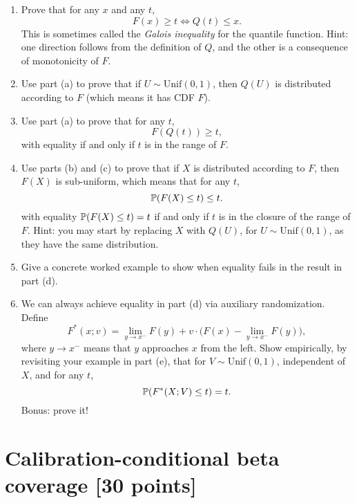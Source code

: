 \documentclass{article}
\begin{document}
\begin{enumerate}[label=(\alph*)]
\item Prove that for any $x$ and any $t$, 
  \marginpar{\small [6 pts]}
  \[
  F(x) \geq t \iff Q(t) \leq x.
  \]
  This is sometimes called the \emph{Galois inequality} for the quantile
  function. Hint: one direction follows from the definition of $Q$, and the
  other is a consequence of monotonicity of $F$.  

\item Use part (a) to prove that if $U \sim \mathrm{Unif}(0,1)$, then $Q(U)$ is
  distributed according to $F$ (which means it has CDF $F$).
  \marginpar{\small [4 pts]}

\item Use part (a) to prove that for any $t$, 
  \marginpar{\small [4 pts]}
  \[
  F(Q(t)) \geq t,
  \]
  with equality if and only if $t$ is in the range of $F$. 

\item Use parts (b) and (c) to prove that if $X$ is distributed according to
  $F$, then $F(X)$ is sub-uniform, which means that for any $t$, 
  \marginpar{\small [6 pts]}
  \[
  \P(F(X) \leq t) \leq t.
  \]
  with equality $\P(F(X) \leq t) = t$ if and only if $t$ is in the closure of
  the range of $F$. Hint: you may start by replacing $X$ with $Q(U)$, for $U
  \sim \mathrm{Unif}(0,1)$, as they have the same distribution.  
  
\item Give a concrete worked example to show when equality fails in the result  
  in part (d).
  \marginpar{\small [4 pts]}

\item We can always achieve equality in part (d) via auxiliary randomization.
  Define
  \[
  F^*(x; v) =  \lim_{y \to x^-} F(y) + v \cdot \Big( F(x) - \lim_{y \to x^-}
  F(y) \Big), 
  \]
  where $y \to x^-$ means that $y$ approaches $x$ from the left. Show
  empirically, by revisiting your example in part (e), that for $V \sim
  \mathrm{Unif}(0,1)$, independent of $X$, and for any $t$,      
  \marginpar{\small [4 pts]}
  \[
  \P(F^*(X; V) \leq t) = t.
  \]
  Bonus: prove it!
\end{enumerate}

\section{Calibration-conditional beta coverage [30 points]}

\def\hC{\hat{C}}
\end{document}
